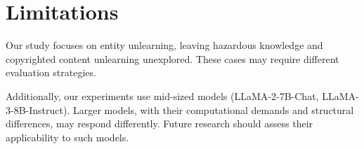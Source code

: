 \section*{Limitations}
Our study focuses on entity unlearning, leaving hazardous knowledge and copyrighted content unlearning unexplored. These cases may require different evaluation strategies.

Additionally, our experiments use mid-sized models (LLaMA-2-7B-Chat, LLaMA-3-8B-Instruct). Larger models, with their computational demands and structural differences, may respond differently. Future research should assess their applicability to such models.

